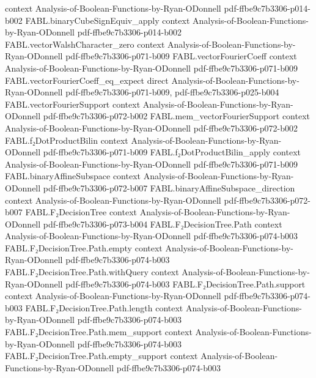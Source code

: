 \begin{theorem}
  {context}
  {Analysis-of-Boolean-Functions-by-Ryan-ODonnell}
  {pdf-ffbe9c7b3306-p014-b002}
\proofstep
  {FABL.binaryCubeSignEquiv_apply}
  {context}
  {Analysis-of-Boolean-Functions-by-Ryan-ODonnell}
  {pdf-ffbe9c7b3306-p014-b002}
\proofstep
  {FABL.vectorWalshCharacter_zero}
  {context}
  {Analysis-of-Boolean-Functions-by-Ryan-ODonnell}
  {pdf-ffbe9c7b3306-p071-b009}
\proofstep
  {FABL.vectorFourierCoeff}
  {context}
  {Analysis-of-Boolean-Functions-by-Ryan-ODonnell}
  {pdf-ffbe9c7b3306-p071-b009}
\proofstep
  {FABL.vectorFourierCoeff_eq_expect}
  {direct}
  {Analysis-of-Boolean-Functions-by-Ryan-ODonnell}
  {pdf-ffbe9c7b3306-p071-b009,
    pdf-ffbe9c7b3306-p025-b004}
\proofstep
  {FABL.vectorFourierSupport}
  {context}
  {Analysis-of-Boolean-Functions-by-Ryan-ODonnell}
  {pdf-ffbe9c7b3306-p072-b002}
\proofstep
  {FABL.mem_vectorFourierSupport}
  {context}
  {Analysis-of-Boolean-Functions-by-Ryan-ODonnell}
  {pdf-ffbe9c7b3306-p072-b002}
\proofstep
  {FABL.f₂DotProductBilin}
  {context}
  {Analysis-of-Boolean-Functions-by-Ryan-ODonnell}
  {pdf-ffbe9c7b3306-p071-b009}
\proofstep
  {FABL.f₂DotProductBilin_apply}
  {context}
  {Analysis-of-Boolean-Functions-by-Ryan-ODonnell}
  {pdf-ffbe9c7b3306-p071-b009}
\proofstep
  {FABL.binaryAffineSubspace}
  {context}
  {Analysis-of-Boolean-Functions-by-Ryan-ODonnell}
  {pdf-ffbe9c7b3306-p072-b007}
\proofstep
  {FABL.binaryAffineSubspace_direction}
  {context}
  {Analysis-of-Boolean-Functions-by-Ryan-ODonnell}
  {pdf-ffbe9c7b3306-p072-b007}
\proofstep
  {FABL.F₂DecisionTree}
  {context}
  {Analysis-of-Boolean-Functions-by-Ryan-ODonnell}
  {pdf-ffbe9c7b3306-p073-b004}
\proofstep
  {FABL.F₂DecisionTree.Path}
  {context}
  {Analysis-of-Boolean-Functions-by-Ryan-ODonnell}
  {pdf-ffbe9c7b3306-p074-b003}
\proofstep
  {FABL.F₂DecisionTree.Path.empty}
  {context}
  {Analysis-of-Boolean-Functions-by-Ryan-ODonnell}
  {pdf-ffbe9c7b3306-p074-b003}
\proofstep
  {FABL.F₂DecisionTree.Path.withQuery}
  {context}
  {Analysis-of-Boolean-Functions-by-Ryan-ODonnell}
  {pdf-ffbe9c7b3306-p074-b003}
\proofstep
  {FABL.F₂DecisionTree.Path.support}
  {context}
  {Analysis-of-Boolean-Functions-by-Ryan-ODonnell}
  {pdf-ffbe9c7b3306-p074-b003}
\proofstep
  {FABL.F₂DecisionTree.Path.length}
  {context}
  {Analysis-of-Boolean-Functions-by-Ryan-ODonnell}
  {pdf-ffbe9c7b3306-p074-b003}
\proofstep
  {FABL.F₂DecisionTree.Path.mem_support}
  {context}
  {Analysis-of-Boolean-Functions-by-Ryan-ODonnell}
  {pdf-ffbe9c7b3306-p074-b003}
\proofstep
  {FABL.F₂DecisionTree.Path.empty_support}
  {context}
  {Analysis-of-Boolean-Functions-by-Ryan-ODonnell}
  {pdf-ffbe9c7b3306-p074-b003}

\end{theorem}
